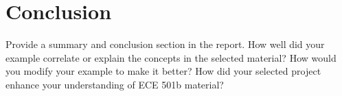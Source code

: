 \documentclass[conference]{IEEEtran}
\begin{document}
	\section{Conclusion}
	Provide a summary and conclusion section in the report. How well did your
example correlate or explain the concepts in the selected material? How would you modify your
example to make it better? How did your selected project enhance your understanding of ECE
501b material?
	
	\nocite{shlens_2014_tutorial}
	\nocite{jaradet_svd_image_compression}
	\nocite{omar_image_compression}
	\nocite{xu_color_conversion}
	\newpage
	{}
	
\end{document}
